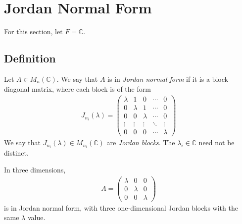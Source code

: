 \section{Jordan Normal Form}

For this section, let $F = \mathbb C$.

\subsection{Definition}
\begin{definition}
	Let $A \in M_n(\mathbb C)$.
	We say that $A$ is in \textit{Jordan normal form} if it is a block diagonal matrix, where each block is of the form
	\begin{align*}
		J_{n_i}(\lambda) =
		\begin{pmatrix}
			\lambda & 1       & 0       & \cdots & 0       \\
			0       & \lambda & 1       & \cdots & 0       \\
			0       & 0       & \lambda & \cdots & 0       \\
			\vdots  & \vdots  & \vdots  & \ddots & \vdots  \\
			0       & 0       & 0       & \cdots & \lambda
		\end{pmatrix}
	\end{align*}
	We say that $J_{n_i}(\lambda) \in M_{n_i}(\mathbb C)$ are \textit{Jordan blocks}.
	The $\lambda_i \in \mathbb C$ need not be distinct.
\end{definition}
\begin{remark}
	In three dimensions,
	\begin{align*}
		A =
		\begin{pmatrix}
			\lambda & 0       & 0       \\
			0       & \lambda & 0       \\
			0       & 0       & \lambda
		\end{pmatrix}
	\end{align*}
	is in Jordan normal form, with three one-dimensional Jordan blocks with the same $\lambda$ value.
\end{remark}

